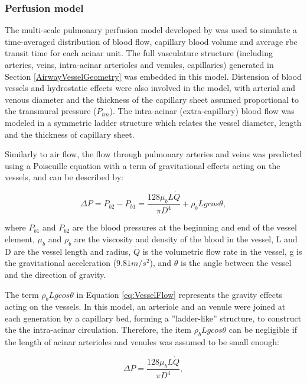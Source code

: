\subsubsection{Perfusion model}
The multi-scale pulmonary perfusion model developed by \cite{clark2011interdependent} was used to simulate a time-averaged distribution of blood flow, capillary blood volume and average \gls{rbc} transit time for each acinar unit. The full vasculature structure (including arteries, veins, intra-acinar arterioles and venules, capillaries) generated in Section \ref{AirwayVesselGeometry} was embedded in this model. Distension of blood vessels and hydrostatic effects were also involved in the model, with arterial and venous diameter and the thickness of the capillary sheet assumed proportional to the transmural pressure ($P_{tm}$). The intra-acinar (extra-capillary) blood flow was modeled in a symmetric ladder structure which relates the vessel diameter, length and the thickness of capillary sheet.

Similarly to air flow, the flow through pulmonary arteries and veins was predicted using a Poiseuille equation  with a term of gravitational effects acting on the vessels, and can be described by:

\begin{equation}
 \label{eq:VesselFlow}
 \Delta P = P_{b2} - P_{b1} = \frac{128 \mu_bL\dot{Q}}{\pi D^{4}} + \rho_b Lgcos\theta,
\end{equation}

\noindent where $P_{b1}$ and $P_{b2}$ are the blood pressures at the beginning and end of the vessel element, $\mu_b$ and $\rho_b$ are the viscosity and density of the blood in the vessel, L and D are the vessel length and radius, $\dot{Q}$ is the volumetric flow rate in the vessel, g is the gravitational acceleration ($9.81m/s^2$), and $\theta$ is the angle between the vessel and the direction of gravity. 

The term $\rho_b Lgcos\theta$ in Equation \ref{eq:VesselFlow} represents the gravity effects acting on the vessels. In this model, an arteriole and an venule were joined at each generation by a capillary bed, forming a ''ladder-like'' structure, to construct the the intra-acinar circulation. Therefore, the item $\rho_b Lgcos\theta$ can be negligible if the length of acinar arterioles and venules was assumed to be small enough:

\begin{equation}
 \label{eq:VesselFlow1}
 \Delta P = \frac{128 \mu_bL\dot{Q}}{\pi D^{4}},
\end{equation}


